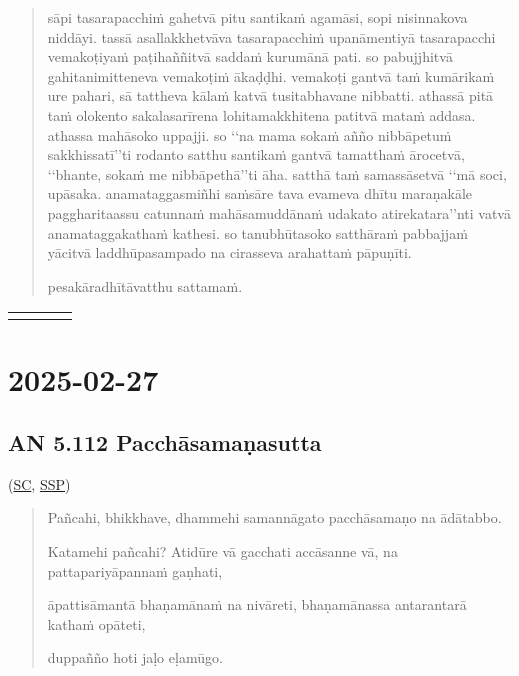 \documentclass[11pt,oneside]{memoir}
\begin{document}
\begin{quote}
sāpi tasarapacchiṁ gahetvā pitu santikaṁ agamāsi, sopi nisinnakova niddāyi. tassā asallakkhetvāva tasarapacchiṁ upanāmentiyā tasarapacchi vemakoṭiyaṁ paṭihaññitvā saddaṁ kurumānā pati. so pabujjhitvā gahitanimitteneva vemakoṭiṁ ākaḍḍhi. vemakoṭi gantvā taṁ kumārikaṁ ure pahari, sā tattheva kālaṁ katvā tusitabhavane nibbatti. athassā pitā taṁ olokento sakalasarīrena lohitamakkhitena patitvā mataṁ addasa. athassa mahāsoko uppajji. so ‘‘na mama sokaṁ añño nibbāpetuṁ sakkhissatī’’ti rodanto satthu santikaṁ gantvā tamatthaṁ ārocetvā, ‘‘bhante, sokaṁ me nibbāpethā’’ti āha. satthā taṁ samassāsetvā ‘‘mā soci, upāsaka. anamataggasmiñhi saṁsāre tava evameva dhītu maraṇakāle paggharitaassu catunnaṁ mahāsamuddānaṁ udakato atirekatara’’nti vatvā anamataggakathaṁ kathesi. so tanubhūtasoko satthāraṁ pabbajjaṁ yācitvā laddhūpasampado na cirasseva arahattaṁ pāpuṇīti.

pesakāradhītāvatthu sattamaṁ.
\end{quote}

\begin{longtable}{L{\colOne} L{\colTwo} H H}
 &  &  & \\[0pt]
\end{longtable}

\chapter{2025-02-27}
\label{sec:org1e37a88}
\section{AN 5.112 Pacchāsamaṇasutta}
\label{sec:orgd8ea3f5}

(\href{https://suttacentral.net/an5.112/pli/ms}{SC}, \href{http://localhost:4848/suttas/an5.112/pli/ms?window\_type=Sutta+Study}{SSP})

\begin{quote}
Pañcahi, bhikkhave, dhammehi samannāgato pacchāsamaṇo na ādātabbo.

Katamehi pañcahi? Atidūre vā gacchati accāsanne vā, na pattapariyāpannaṁ gaṇhati,

āpattisāmantā bhaṇamānaṁ na nivāreti, bhaṇamānassa antarantarā kathaṁ opāteti,

duppañño hoti jaḷo eḷamūgo.
\end{quote}
\end{document}
